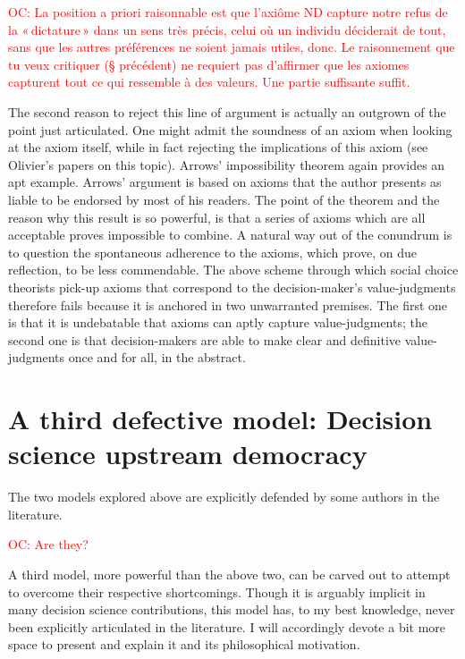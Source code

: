 \documentclass[preprint,11pt]{elsarticle}
\newcommand{\commentOC}[1]{\textcolor{red}{OC: #1}}
\begin{document}
\commentOC{ La position a priori raisonnable est
que l’axiôme ND capture notre refus de la « dictature » dans
un sens très précis, celui où un individu déciderait de tout,
sans que les autres préférences ne soient jamais utiles,
donc.
 Le raisonnement que tu veux
critiquer (§ précédent) ne requiert pas d’affirmer que les
axiomes capturent tout ce qui ressemble à des valeurs. Une
partie suffisante suffit.}

The second reason to reject this line of argument is actually an outgrown of the point just articulated. One might admit the soundness of an axiom when looking at the axiom itself, while in fact rejecting the implications of this axiom (see Olivier’s papers on this topic). Arrows’ impossibility theorem \cite{arrow_social_2012} again provides an apt example. Arrows’ argument is based on axioms that the author presents as liable to be endorsed by most of his readers. The point of the theorem and the reason why this result is so powerful, is that a series of axioms which are all acceptable proves impossible to combine. A natural way out of the conundrum is to question the spontaneous adherence to the axioms, which prove, on due reflection, to be less commendable.
The above scheme through which social choice theorists pick-up axioms that correspond to the decision-maker’s value-judgments therefore fails because it is anchored in two unwarranted premises. The first one is that it is undebatable that axioms can aptly capture value-judgments; the second one is that decision-makers are able to make clear and definitive value-judgments once and for all, in the abstract.

\section{A third defective model: Decision science upstream democracy}
The two models explored above are explicitly defended by some authors in the literature. 

\commentOC{ Are they?}

A third model, more powerful than the above two, can be carved out to attempt to overcome their respective shortcomings. Though it is arguably implicit in many decision science contributions, this model has, to my best knowledge, never been explicitly articulated in the literature. I will accordingly devote a bit more space to present and explain it and its philosophical motivation.
\end{document}

